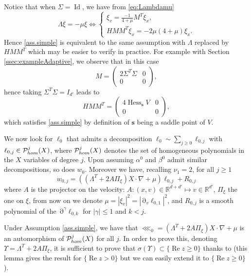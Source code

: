 \documentclass[12pt]{amsart}
\renewcommand{\Re}{\operatorname{Re}}
\newcommand{\Id}{\operatorname{Id}}
\newcommand{\R}{\mathbb R}
\newcommand{\Hess}{\operatorname{Hess}}
\numberwithin{equation}{section}
\numberwithin{figure}{section}
\def\s{\mathbf{s}}
\DeclareMathOperator{\p}{\partial}
\begin{document}
Notice that when $\Sigma = \Id$, we have from \eqref{eq:Lambdamu}
\begin{equation*}
\Lambda\xi = -\mu\xi \iff \left\{\begin{array}{l}
    \xi_v = \frac{-1}{4+\mu}M^T\xi_x,\\
    HMM^T\xi_x = -2\mu(4+\mu)\xi_x.
\end{array}\right.
\end{equation*}
Hence \eqref{ass.simple} is equivalent to the same assumption with $\Lambda$ replaced by $HMM^T$ which may be easier to verify in practice. For example with Section \ref{ssec:exampleAdaptive}, we observe that in this case
\begin{equation*}
M = \begin{pmatrix}2\Sigma^T\Sigma&0\\0&0\end{pmatrix},
\end{equation*}
hence taking $\Sigma^T\Sigma = I_{d'}$ leads to
\begin{equation*}
HMM^T = \begin{pmatrix}4\Hess_\s V&0\\0&0\end{pmatrix},
\end{equation*}
which satisfies \eqref{ass.simple} by definition of $\s$ being a saddle point of $V$.

We now look for $\ell_0$ that admits a decomposition $\ell_0\sim\sum_{j\geq0}\ell_{0,j}$ with $\ell_{0,j}\in{\mathcal P}^j_{hom}(X)$, where ${\mathcal P}^j_{hom}(X)$ denotes the set of homogeneous polynomials in the $X$ variables of degree $j$. Upon assuming $\alpha^0$ and $\beta^0$ admit similar decompositions, so does $w_0$. Moreover we have, recalling $\nu_1=2$, for all $j\geq1$
\begin{equation*}
w_{0,j} = ((\Lambda^T + 2A\Pi_\xi)X\cdot\nabla + \mu)\ell_{0,j} + R_{0,j}
\end{equation*}
where $A$ is the projector on the velocity: $A:(x,v)\in\R^{d+d'}\mapsto v\in\R^{d'}$, $\Pi_\xi$ the one on $\xi$, from now on we denote $\mu = |\xi_v|^2 = |\p_v\ell_{0,1}|^2$, and $R_{0,j}$ is a smooth polynomial of the $\p^\gamma\ell_{0,k}$ for $|\gamma|\leq1$ and $k<j$.

Under Assumption \eqref{ass.simple}, we have that $\lll_0 = (\Lambda^T + 2A\Pi_\xi)X\cdot\nabla + \mu$ is an automorphism of ${\mathcal P}^j_{hom}(X)$ for all $j$. In order to prove this, denoting $\Upsilon = \Lambda^T + 2A\Pi_\xi$, it is sufficient to prove that $\sigma(\Upsilon)\subset\{\Re z\geq0\}$ thanks to \cite[Lemma A.1]{BoLePMi22} (this lemma gives the result for $\{\Re z>0\}$ but we can easily extend it to $\{\Re z\geq0\}$).
\end{document}
